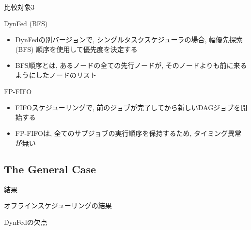 \begin{frame}{比較対象3}
    \begin{block}{DynFed (BFS)}
        \setlength{\linewidth}{0.98\columnwidth}
        \begin{itemize}
            \item DynFedの別バージョンで, シングルタスクスケジューラの場合, 幅優先探索 (BFS) 順序を使用して優先度を決定する
            \item BFS順序とは, あるノードの全ての先行ノードが, そのノードよりも前に来るようにしたノードのリスト
        \end{itemize}
    \end{block}
    \begin{block}{FP-FIFO}
        \setlength{\linewidth}{0.98\columnwidth}
        \begin{itemize}
            \item FIFOスケジューリングで, 前のジョブが完了してから新しいDAGジョブを開始する
            \item FP-FIFOは, 全てのサブジョブの実行順序を保持するため, タイミング異常が無い
        \end{itemize}
    \end{block}
\end{frame}


\subsection{The General Case}
\label{ssec: gc}

\begin{frame}{結果}
\end{frame}

\begin{frame}{オフラインスケジューリングの結果}
\end{frame}

\begin{frame}{DynFedの欠点}
\end{frame}


